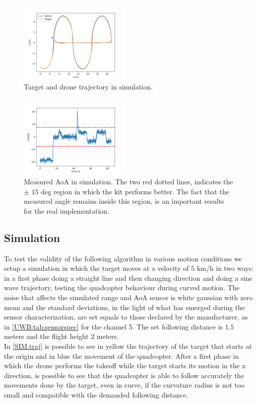 \begin{figure}
    \centering
    \includegraphics[width=0.48\textwidth]{images/Simulation/Drone_Target x-y Position.png}
    \caption{Target and drone trajectory in simulation.}
    \label{SIM:traj}
\end{figure}

\begin{figure}
    \centering
    \includegraphics[width=0.48\textwidth]{images/Simulation/AoA measures.png}
    \caption{Measured AoA in simulation. The two red dotted lines, indicates the $\pm$ $15$ deg region in which the kit performs better. The fact that the measured angle remains inside this region, is an important results for the real implementation.}
    \label{SIM:aoa in time}
\end{figure}

\subsection{Simulation}\label{SIM_RES}
To test the validity of the following algorithm in various motion conditions we setup a simulation in which the target moves at a velocity of $5$ km/h in two ways: in a first phase doing a straight line and then changing direction and doing a sine wave trajectory, testing the quadcopter behaviour during curved motion. The noise that affects the simulated range and AoA sensor is white gaussian with zero mean and the standard deviations, in the light of what has emerged during the sensor characterization, are set equals to those declared by the manufacturer, as in \autoref{UWB:tab:sensorspec} for the channel 5. The set following distance is $1.5$ meters and the flight height $2$ meters.\\
In \autoref{SIM:traj} is possible to see in yellow the trajectory of the target that starts at the origin and in blue the movement of the quadcopter. After a first phase in which the drone performs the takeoff while the target starts its motion in the x direction, is possible to see that the quadcopter is able to follow accurately the movements done by the target, even in curve, if the curvature radius is not too small and compatible with the demanded following distance.\\

